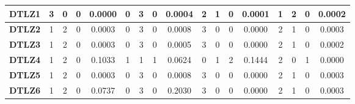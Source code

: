 \begin{table*}[t]
{\begin{tabular}{c|c|c|c|c|c|c|c|c|c|c|c|c|c|c|c|c|}
\multicolumn{1}{|c|}{\textbf{DTLZ1}} & 3                   & 0                     & 0                          & 0.0000          & 0                   & 3                     & 0                          & 0.0004          & 2                   & 1                     & 0                          & 0.0001          & 1                   & 2                     & 0                          & 0.0002          \\ \hline
\multicolumn{1}{|c|}{\textbf{DTLZ2}} & 1                   & 2                     & 0                          & 0.0003          & 0                   & 3                     & 0                          & 0.0008          & 3                   & 0                     & 0                          & 0.0000          & 2                   & 1                     & 0                          & 0.0003          \\ \hline
\multicolumn{1}{|c|}{\textbf{DTLZ3}} & 1                   & 2                     & 0                          & 0.0003          & 0                   & 3                     & 0                          & 0.0005          & 3                   & 0                     & 0                          & 0.0000          & 2                   & 1                     & 0                          & 0.0002          \\ \hline
\multicolumn{1}{|c|}{\textbf{DTLZ4}} & 1                   & 2                     & 0                          & 0.1033          & 1                   & 1                     & 1                          & 0.0624          & 0                   & 1                     & 2                          & 0.1444          & 2                   & 0                     & 1                          & 0.0000          \\ \hline
\multicolumn{1}{|c|}{\textbf{DTLZ5}} & 1                   & 2                     & 0                          & 0.0003          & 0                   & 3                     & 0                          & 0.0008          & 3                   & 0                     & 0                          & 0.0000          & 2                   & 1                     & 0                          & 0.0003          \\ \hline
\multicolumn{1}{|c|}{\textbf{DTLZ6}} & 1                   & 2                     & 0                          & 0.0737          & 0                   & 3                     & 0                          & 0.2030          & 3                   & 0                     & 0                          & 0.0000          & 2                   & 1                     & 0                          & 0.0003          \\ \hline

\end{tabular}}
\end{table*}
